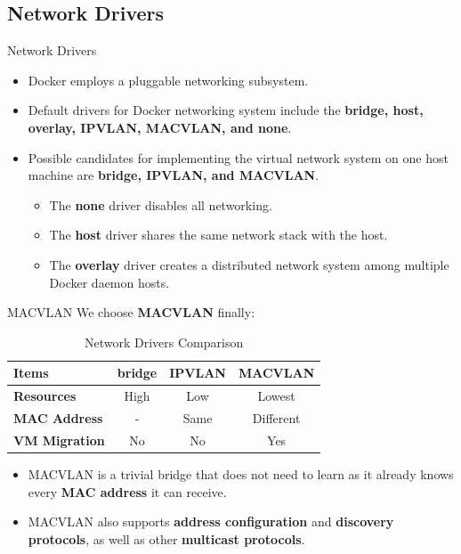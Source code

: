 \documentclass{beamer}
\begin{document}
\subsection{Network Drivers}
\begin{frame}{Network Drivers}
\begin{itemize}
\item Docker employs a pluggable networking subsystem.
\item Default drivers for Docker networking system include the \textbf{bridge, host, overlay, IPVLAN, MACVLAN, and none}.
\item Possible candidates for implementing the virtual network system on one host machine are \textbf{bridge, IPVLAN, and MACVLAN}.
\begin{itemize}
    \item The \textbf{none} driver disables all networking.
    \item The \textbf{host} driver shares the same network stack with the host.
    \item The \textbf{overlay} driver creates a distributed network system among multiple Docker daemon hosts.
\end{itemize}
\end{itemize}
\end{frame}

\begin{frame}{MACVLAN}
We choose \textbf{MACVLAN} finally:
\begin{table}[t!]
  \begin{center}
    \caption{Network Drivers Comparison}
    \begin{tabular}{|l|c|c|c|}
    \hline
    \textbf{Items} & \textbf{bridge} & \textbf{IPVLAN} & \textbf{MACVLAN} \\
    \hline
    \textbf{Resources} & High & Low & Lowest \\
    \hline
    \textbf{MAC Address} & - & Same & Different \\
    \hline
    \textbf{VM Migration} & No & No & Yes \\
    \hline
    \end{tabular}
    \label{tab:comparedrivers}
  \end{center}
\end{table}
\begin{itemize}
 \item MACVLAN is a trivial bridge that does not need to learn as it already knows every \textbf{MAC address} it can receive.
\item MACVLAN also supports \textbf{address configuration} and \textbf{discovery protocols}, as well as other \textbf{multicast protocols}.
\end{itemize}
\end{frame}
\end{document}
